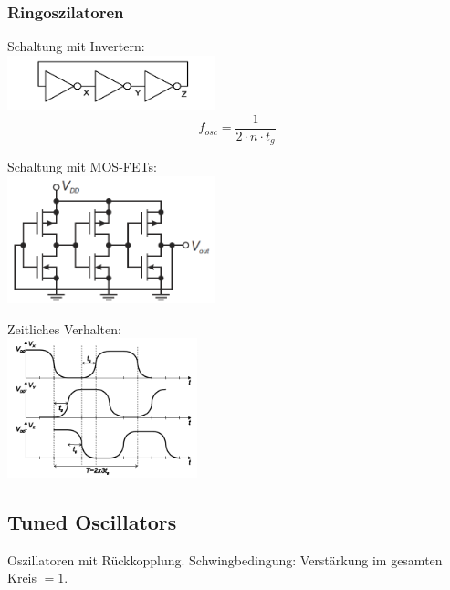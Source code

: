 \subsubsection{Ringoszilatoren}
	\begin{minipage}[T]{6cm}
		Schaltung mit Invertern: \\
		\includegraphics[width=6cm]{images/osziRing.png} \\
		\[ f_{osc} = \frac{1}{2 \cdot n \cdot t_g} \] 
	\end{minipage}
	\begin{minipage}{6cm}
		Schaltung mit MOS-FETs: \\
		\includegraphics[width=6cm]{images/osziRingCMOS.png} \\
	\end{minipage}
	\begin{minipage}{6cm}
		Zeitliches Verhalten: \\
		\includegraphics[width=5.5cm]{images/osziRingSignal.png} \\
	\end{minipage}	

\newpage	
\subsection{Tuned Oscillators}
	Oszillatoren mit Rückkopplung. Schwingbedingung: Verstärkung im gesamten Kreis $=1$. 
